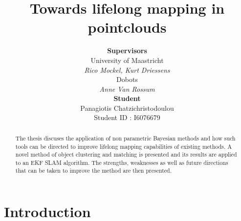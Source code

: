 \documentclass[twoside,hidelinks]{article}
\title{\vspace{-15mm}\fontsize{24pt}{10pt}\selectfont\textbf{{Towards lifelong mapping in pointclouds}}} %
\author{
\large
\normalsize \textbf{Supervisors} \\ 
\normalsize University of Maastricht \\ %
\normalsize \textit{Rico Mockel, Kurt Driessens} \\
\normalsize Dobots \\
\normalsize \textit{Anne Van Rossum} \\
\normalsize \textbf{Student} \\
\normalsize Panagiotis Chatzichristodoulou \\
\normalsize Student ID : I6076679
\vspace{-5mm}
}
\date{}
\begin{document}
\maketitle %

\thispagestyle{fancy} %


 
\begin{abstract}

\noindent The thesis discuses the application of non parametric Bayesian methods and how such tools can be directed to improve lifelong mapping capabilities of existing methods. A novel method of object clustering and matching is presented and its results are applied to an EKF SLAM algorithm. The strengths, weaknesses as well as future directions that can be taken to improve the method are then presented. 


\end{abstract}

\newpage
\thispagestyle{empty}
 
\tableofcontents

\listoffigures
 
\listoftables
 
\newpage


\section{Introduction}
\end{document}
